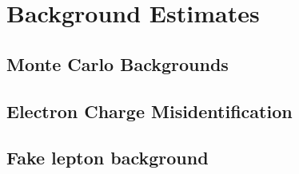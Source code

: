 \section{Background Estimates}
\label{sec:bg_estimates}




\subsection{Monte Carlo Backgrounds}
\label{sec:mcbg}

\subsection{Electron Charge Misidentification}
\label{sec:charge_misid}
  
\subsection{Fake lepton background}
\label{sec:bg_fake}

